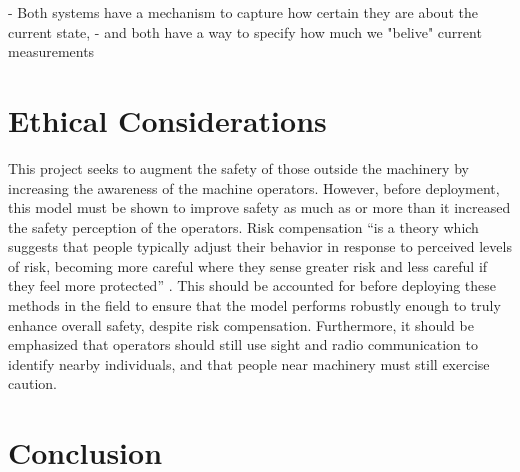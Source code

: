 \documentclass[11pt]{amsart}
\begin{document}
- Both systems have a mechanism to capture how certain they are about the current state,
- and both have a way to specify how much we "belive" current measurements

\section{Ethical Considerations}
This project seeks to augment the safety of those outside the machinery by increasing the awareness of the machine operators. However, before deployment, this model must be 
shown to improve safety as much as or more than it increased the safety perception of the operators. Risk compensation “is a theory which suggests that people typically adjust 
their behavior in response to perceived levels of risk, becoming more careful where they sense greater risk and less careful if they feel more protected” \cite{Risk}. This should 
be accounted for before deploying these methods in the field to ensure that the model performs robustly enough to truly enhance overall safety, despite risk compensation. Furthermore, 
it should be emphasized that operators should still use sight and radio communication to identify nearby individuals, and that people near machinery must still exercise caution. 

\section{Conclusion}
\end{document}
